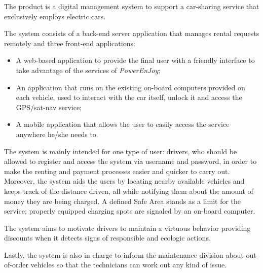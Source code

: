 The product is a digital management system to support a car-sharing service that exclusively employs electric cars.

The system consists of a back-end server application that manages rental requests remotely and three front-end applications:

\begin{itemize}
\item A web-based application to provide the final user with a friendly interface to take advantage of the services of \hbox{\emph{PowerEnJoy}};
\item An application that runs on the existing on-board computers provided on each vehicle, used to interact with the car itself, unlock it and access the GPS/sat-nav service;
\item A mobile application that allows the user to easily access the service anywhere he/she needs to.
\end{itemize}
The system is mainly intended for one type of user: drivers, who should be allowed to register and access the system via username and password, in order to make the renting and payment processes easier and quicker to carry out. Moreover, the system aids the users by locating nearby available vehicles and keeps track of the distance driven, all while notifying them about the amount of money they are being charged. A defined Safe Area stands as a limit for the service; properly equipped charging spots are signaled by an on-board computer.

The system aims to motivate drivers to maintain a virtuous behavior providing discounts when it detects signs of responsible and ecologic actions.

Lastly, the system is also in charge to inform the maintenance division about out-of-order vehicles so that the technicians can work out any kind of issue.